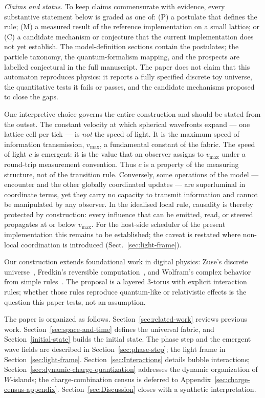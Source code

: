 \documentclass{ijuc}
\begin{document}
\emph{Claims and status.} To keep claims commensurate with evidence, every substantive statement below is graded as one of: (P) a postulate that defines the rule; (M) a measured result of the reference implementation on a small lattice; or (C) a candidate mechanism or conjecture that the current implementation does not yet establish.  The model-definition sections contain the postulates; the particle taxonomy, the quantum-formalism mapping, and the prospects are labelled conjectural in the full manuscript.  The paper does not claim that this automaton reproduces physics: it reports a fully specified discrete toy universe, the quantitative tests it fails or passes, and the candidate mechanisms proposed to close the gaps.

One interpretive choice governs the entire construction and should be stated from the outset. The constant velocity at which spherical wavefronts expand --- one lattice cell per tick --- is \emph{not} the speed of light. It is the maximum speed of information transmission, $v_{\max}$, a fundamental constant of the fabric. The speed of light $c$ is emergent: it is the value that an observer assigns to $v_{\max}$ under a round-trip measurement convention. Thus $c$ is a property of the measuring structure, not of the transition rule. Conversely, some operations of the model --- encounter and the other globally coordinated updates --- are superluminal in coordinate terms, yet they carry no capacity to transmit information and cannot be manipulated by any observer. In the idealised local rule, causality is thereby protected by construction: every influence that can be emitted, read, or steered propagates at or below $v_{\max}$.  For the host-side scheduler of the present implementation this remains to be established; the caveat is restated where non-local coordination is introduced (Sect.~\ref{sec:light-frame}).

Our construction extends foundational work in digital physics: Zuse's discrete universe~\cite{zuse}, Fredkin's reversible computation~\cite{fredkin}, and Wolfram's complex behavior from simple rules~\cite{wolfram}. The proposal is a layered 3-torus with explicit interaction rules; whether those rules reproduce quantum-like or relativistic effects is the question this paper tests, not an assumption.

The paper is organized as follows. Section~\ref{sec:related-work} reviews previous work. Section~\ref{sec:space-and-time} defines the universal fabric, and Section~\ref{initial-state} builds the initial state. The phase step and the emergent wave fields are described in Section~\ref{sec:phase-step}; the light frame in Section~\ref{sec:light-frame}. Section~\ref{sec:Interactions} details bubble interactions; Section~\ref{sec:dynamic-charge-quantization} addresses the dynamic organization of $W$-islands; the charge-combination census is deferred to Appendix~\ref{sec:charge-census-appendix}. Section~\ref{sec:Discussion} closes with a synthetic interpretation.
\end{document}
